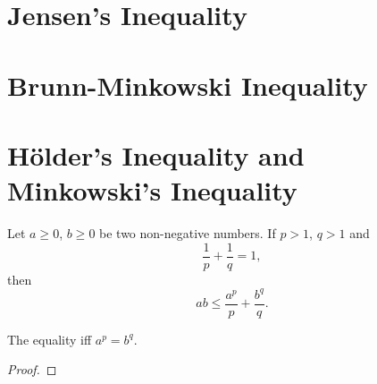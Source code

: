 \documentclass[openany]{book}
\begin{document}
\section{Jensen's Inequality}
\section{Brunn-Minkowski Inequality}
\section{H\"older's Inequality and Minkowski's Inequality}
\begin{theorem}
	Let $a \geq 0$, $b \geq 0$ be two non-negative numbers. 
	If $p > 1$, $q > 1$ and
	\begin{equation*}
		\frac 1 p + \frac 1 q = 1,
	\end{equation*}
	then
	\begin{equation*}
		ab \leq \frac{a^p}{p} + \frac{b^q}{q}.
	\end{equation*}

	The equality iff $a^p = b^q$.
\end{theorem}
\begin{proof}
	
\end{proof}


\backmatter{}

\nocite{*} %
\printbibliography[heading=bibliography, title={Bibliography}]

\printindex[symbol]

\printindex
\end{document}
